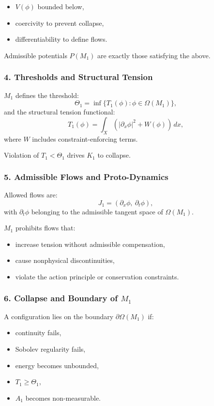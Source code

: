 \begin{itemize}
    \item $V(\phi)$ bounded below,
    \item coercivity to prevent collapse,
    \item differentiability to define flows.
\end{itemize}

Admissible potentials $P(M_1)$ are exactly those satisfying the above.

\subsubsection*{4. Thresholds and Structural Tension}

$M_1$ defines the threshold:
\[
\Theta_1 = \inf \{ T_1(\phi) : \phi \in \Omega(M_1) \},
\]
and the structural tension functional:
\[
T_1(\phi) = 
\int_X \left(
|\partial_x \phi|^2 + W(\phi)
\right)\, dx,
\]
where $W$ includes constraint-enforcing terms.

Violation of $T_1 < \Theta_1$ drives $K_1$ to collapse.

\subsubsection*{5. Admissible Flows and Proto-Dynamics}

Allowed flows are:
\[
J_1 = (\partial_x \phi,\ \partial_t \phi),
\]
with $\partial_t\phi$ belonging to the admissible tangent space of $\Omega(M_1)$.

$M_1$ prohibits flows that:
\begin{itemize}
    \item increase tension without admissible compensation,
    \item cause nonphysical discontinuities,
    \item violate the action principle or conservation constraints.
\end{itemize}

\subsubsection*{6. Collapse and Boundary of \texorpdfstring{$M_1$}{M_1}}

A configuration lies on the boundary $\partial\Omega(M_1)$ if:

\begin{itemize}
    \item continuity fails,
    \item Sobolev regularity fails,
    \item energy becomes unbounded,
    \item $T_1 \ge \Theta_1$,
    \item $A_1$ becomes non-measurable.
\end{itemize}

